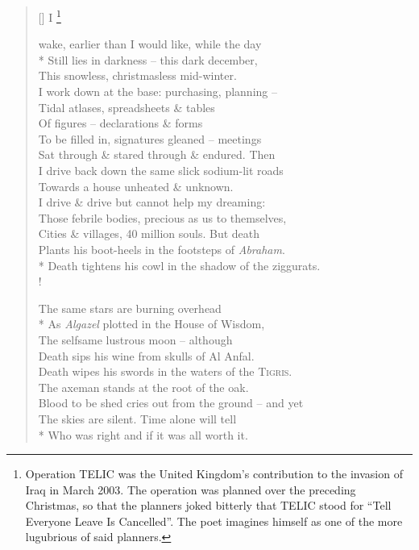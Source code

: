 \documentclass[openany]{amsbook}
\newcommand\blfootnote[1]{%
    \begingroup
    \renewcommand\thefootnote{}\footnote{#1}%
    \addtocounter{footnote}{-1}%
    \endgroup
}
\begin{document}
\settowidth{\versewidth}{Death tightens his cowl in the shadow of the ziggurats.}
\begin{verse}[\versewidth]
    I\blfootnote{Operation TELIC was the United Kingdom's contribution to the invasion of Iraq in March 2003. The operation was planned over the preceding Christmas, so that the planners joked bitterly that TELIC stood for ``Tell Everyone Leave Is Cancelled''. The poet imagines himself as one of the more lugubrious of said planners.} wake, earlier than I would like, while the day\\*
    Still lies in darkness -- this dark december,\\
    This snowless, christmasless mid-winter.\\
    I work down at the base: purchasing, planning --\\
    Tidal atlases, spreadsheets \& tables\\
    Of figures -- declarations \& forms\\
    To be filled in, signatures gleaned -- meetings\\
    Sat through \& stared through \& endured. Then\\
    I drive back down the same slick sodium-lit roads\\
    Towards a house unheated \& unknown.\\
    I drive \& drive but cannot help my dreaming:\\
    Those febrile bodies, precious as us to themselves,\\
    Cities \& villages, 40 million souls. But death\\
    Plants his boot-heels in the footsteps of \textit{Abraham}.\\*
    Death tightens his cowl in the shadow of the ziggurats.\\!

    The same stars are burning overhead\\*
    As \textit{Algazel} plotted in the House of Wisdom,\\
    The selfsame lustrous moon -- although\\
    Death sips his wine from skulls of Al Anfal.\\
    Death wipes his swords in the waters of the \textsc{Tigris}.\\
    The axeman stands at the root of the oak.\\
    Blood to be shed cries out from the ground -- and yet\\
    The skies are silent. Time alone will tell\\*
    Who was right and if it was all worth it.
\end{verse}
\end{document}
